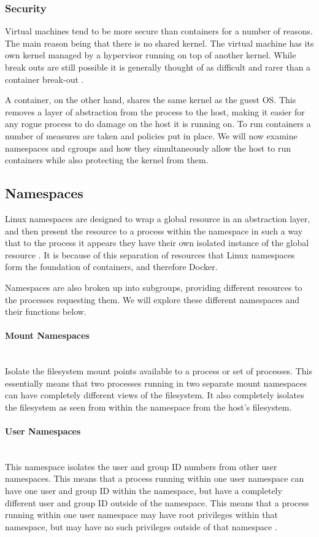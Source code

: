 \documentclass{article}
\begin{document}
\subsubsection{Security}

Virtual machines tend to be more secure than containers for a number of reasons. The main reason being that there is no shared kernel. The virtual machine has its own kernel managed by a hypervisor running on top of another kernel. While break outs are still possible it is generally thought of as difficult and rarer than a container break-out \citep{Whitepaper2016}.

A container, on the other hand, shares the same kernel as the guest OS. This removes a layer of abstraction from the process to the host, making it easier for any rogue process to do damage on the host it is running on. To run containers a number of measures are taken and policies put in place. We will now examine namespaces and cgroups and how they simultaneously allow the host to run containers while also protecting the kernel from them.


\subsection{Namespaces}
\label{subs:Namespaces}
Linux namespaces are designed to wrap a global resource in an abstraction layer, and then present the resource to a process within the namespace in such a way that to the process it appears they have their own isolated instance of the global resource \citep{Kerrisk2013}. It is because of this separation of resources that Linux namespaces form the foundation of containers, and therefore Docker.

Namespaces are also broken up into subgroups, providing different resources to the processes requesting them. We will explore these different namespaces and their functions below.


\paragraph{Mount Namespaces}\mbox{}\\
Isolate the filesystem mount points available to a process or set of processes. This essentially means that two processes running in two separate mount namespaces can have completely different views of the filesystem. It also completely isolates the filesystem as seen from within the namespace from the host's filesystem.

\paragraph{User Namespaces}\mbox{}\\
This namespace isolates the user and group ID numbers from other user namespaces. This means that a process running within one user namespace can have one user and group ID within the namespace, but have a completely different user and group ID outside of the namespace. This means that a process running within one user namespace may have root privileges within that namespace, but may have no such privileges outside of that namespace \citep{Kerrisk2013}.
\end{document}
